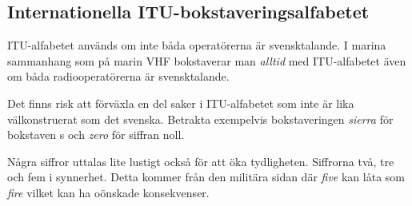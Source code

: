 \subsection{Internationella ITU-bokstaveringsalfabetet}

ITU-alfabetet används om inte båda operatörerna är svensktalande. I marina sammanhang som på marin VHF bokstaverar man \textit{alltid} med ITU-alfabetet även om båda radiooperatörerna är svensktalande.

Det finns risk att förväxla en del saker i ITU-alfabetet som inte är lika välkonstruerat som det svenska. Betrakta exempelvis bokstaveringen \textit{sierra} för bokstaven s och \textit{zero} för siffran noll. 

Några siffror uttalas lite lustigt också för att öka tydligheten. Siffrorna två, tre och fem i synnerhet. Detta kommer från den militära sidan där \textit{five} kan låta som \textit{fire} vilket kan ha oönskade konsekvenser.

